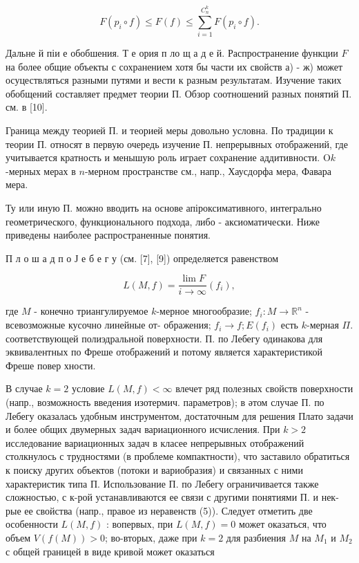 \documentclass[10pt]{article}
\begin{document}
\[

F\left(p_{i} \circ f\right) \leqslant F(f) \leqslant \sum_{i=1}^{C_{n}^{k}} F\left(p_{i} \circ f\right) .

\]



Дальне й піи е обобшения. Т е ория п ло щ а д е й. Распространение функции $F$ на более общие объекты с сохранением хотя бы части их свойств а) - ж) может осуцествляться разными путями и вести к разным результатам. Изучение таких обобщений составляет предмет теории П. Обзор соотношений разных понятий П. см. в [10].



Граница между теорией П. и теорией меры довольно условна. По традиции к теории П. относят в первую очередь изучение П. непрерывных отображений, где учитывается кратность и менышую роль играет сохранение аддитивности. $\mathrm{O} k$-мерных мерах в $n$-мерном пространстве см., напр., Хаусдорфа мера, Фавара мера.



Ту или иную П. можно вводить на основе апіроксимативного, интегрально геометрического, функционального подхода, либо - аксиоматически. Ниже приведены наиболее распространенные понятия.



П л о ш а д п о Ј е б е г у (см. [7], [9]) определяется равенством



\[

L(M, f)=\frac{\lim F}{i \rightarrow \infty}\left(f_{i}\right),

\]



где $M$ - конечно триангулируемое $k$-мерное многообразие; $f_{i}: M \rightarrow \mathbb{R}^{n}$ - всевозможные кусочно линейные от- ображения; $f_{i} \rightarrow f ; E\left(f_{i}\right)$ есть $k$-мерная $\Pi$. соответствующей полиэдральной поверхности. П. по Лебегу одинакова для эквивалентных по Фреше отображений и потому является характеристикой Фреше повер хности.



В случае $k=2$ условие $L(M, f)<\infty$ влечет ряд полезных свойств поверхности (напр., возможность введения изотермич. параметров); в әтом случае П. по Лебегу оказалась удобным инструментом, достаточным для решения Плато задачи и более общих двумерных задач вариационного исчисления. При $k>2$ исследование вариационных задач в класее непрерывных отображений столкнулось с трудностями (в проблеме компактности), что заставило обратиться к поиску других объектов (потоки и вариобразия) и связанных с ними характеристик типа П. Использование П. по Лебегу ограничивается также сложностью, с к-рой устанавливаются ее связи с другими понятиями П. и нек-рые ее свойства (напр., правое из неравенств (5)). Следует отметить две особенности $L(M, f)$ : вопервых, при $L(M, f)=0$ может оказаться, что объем $V(f(M))>0$; во-вторых, даже при $k=2$ для разбиения $M$ на $M_{1}$ и $M_{2}$ с общей границей в виде кривой может оказаться
\end{document}
